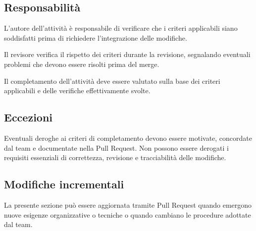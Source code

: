 \documentclass[11pt, a4paper]{article}
\begin{document}
\subsection{Responsabilità}

L'autore dell'attività è responsabile di verificare che i criteri applicabili siano soddisfatti prima di richiedere l'integrazione delle modifiche.

Il revisore verifica il rispetto dei criteri durante la revisione, segnalando eventuali problemi che devono essere risolti prima del merge.

Il completamento dell'attività deve essere valutato sulla base dei criteri applicabili e delle verifiche effettivamente svolte.

\subsection{Eccezioni}

Eventuali deroghe ai criteri di completamento devono essere motivate, concordate dal team e documentate nella Pull Request. Non possono essere derogati i requisiti essenziali di correttezza, revisione e tracciabilità delle modifiche.

\subsection{Modifiche incrementali}

La presente sezione può essere aggiornata tramite Pull Request quando emergono nuove esigenze organizzative o tecniche o quando cambiano le procedure adottate dal team.
\end{document}

